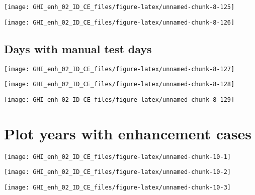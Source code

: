 \documentclass[
  10pt,
  a4paper,oneside]{article}
\begin{document}
\begin{center}\texttt{[image: GHI\_enh\_02\_ID\_CE\_files/figure-latex/unnamed-chunk-8-125]} \end{center}

\begin{center}\texttt{[image: GHI\_enh\_02\_ID\_CE\_files/figure-latex/unnamed-chunk-8-126]} \end{center}

\FloatBarrier

\hypertarget{days-with-manual-test-days}{%
\subsection{Days with manual test days}\label{days-with-manual-test-days}}

\begin{center}\texttt{[image: GHI\_enh\_02\_ID\_CE\_files/figure-latex/unnamed-chunk-8-127]} \end{center}

\begin{center}\texttt{[image: GHI\_enh\_02\_ID\_CE\_files/figure-latex/unnamed-chunk-8-128]} \end{center}

\begin{center}\texttt{[image: GHI\_enh\_02\_ID\_CE\_files/figure-latex/unnamed-chunk-8-129]} \end{center}

\newpage
\FloatBarrier

\hypertarget{plot-years-with-enhancement-cases}{%
\section{Plot years with enhancement cases}\label{plot-years-with-enhancement-cases}}

\begin{center}\texttt{[image: GHI\_enh\_02\_ID\_CE\_files/figure-latex/unnamed-chunk-10-1]} \end{center}

\begin{center}\texttt{[image: GHI\_enh\_02\_ID\_CE\_files/figure-latex/unnamed-chunk-10-2]} \end{center}

\begin{center}\texttt{[image: GHI\_enh\_02\_ID\_CE\_files/figure-latex/unnamed-chunk-10-3]} \end{center}
\end{document}

